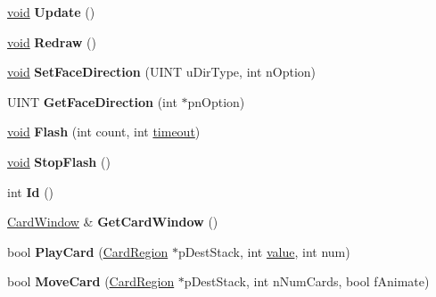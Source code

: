 \begin{DoxyCompactItemize}
\item 
\mbox{\label{class_card_region_abbb68d48164369bf59fa4f15acc79df6}} 
\hyperlink{interfacevoid}{void} {\bfseries Update} ()
\item 
\mbox{\label{class_card_region_a76daf58d4b7a18b00682cda81d3d1186}} 
\hyperlink{interfacevoid}{void} {\bfseries Redraw} ()
\item 
\mbox{\label{class_card_region_a79dd4bb79198585bbc74464388738b1e}} 
\hyperlink{interfacevoid}{void} {\bfseries Set\+Face\+Direction} (U\+I\+NT u\+Dir\+Type, int n\+Option)
\item 
\mbox{\label{class_card_region_ac565890253a6e03ebd7165f3b2f65f4b}} 
U\+I\+NT {\bfseries Get\+Face\+Direction} (int $\ast$pn\+Option)
\item 
\mbox{\label{class_card_region_a0d3e7d189902a55ab86363e08512bf31}} 
\hyperlink{interfacevoid}{void} {\bfseries Flash} (int count, int \hyperlink{structtimeout}{timeout})
\item 
\mbox{\label{class_card_region_aff6e24d95a0e6317cfd4cea1d703dfd7}} 
\hyperlink{interfacevoid}{void} {\bfseries Stop\+Flash} ()
\item 
\mbox{\label{class_card_region_a21d9d6d4d22e429ccca19e75b0674a59}} 
int {\bfseries Id} ()
\item 
\mbox{\label{class_card_region_ac1751961ffc7d61a7dd22aff8f0daa02}} 
\hyperlink{class_card_window}{Card\+Window} \& {\bfseries Get\+Card\+Window} ()
\item 
\mbox{\label{class_card_region_a503b75247cedcb3a757dea989e32f5de}} 
bool {\bfseries Play\+Card} (\hyperlink{class_card_region}{Card\+Region} $\ast$p\+Dest\+Stack, int \hyperlink{unionvalue}{value}, int num)
\item 
\mbox{\label{class_card_region_a14fa9b5c7c72da419b8f73414b68ca8f}} 
bool {\bfseries Move\+Card} (\hyperlink{class_card_region}{Card\+Region} $\ast$p\+Dest\+Stack, int n\+Num\+Cards, bool f\+Animate)

\end{DoxyCompactItemize}
